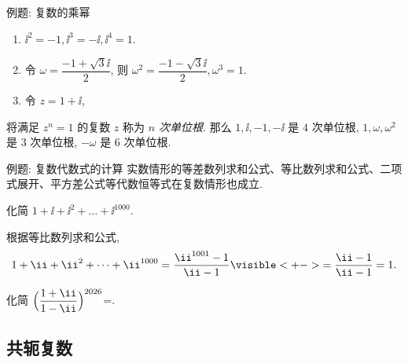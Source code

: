 \begin{frame}{例题: 复数的乘幂}
	\onslide<+->
	\begin{example}
		\begin{enumerate}
			\item $\ii^2=-1,\ii^3=-\ii ,\ii^4=1$.
			\onslide<+->{%
			一般地, 对于整数 $n$, 
			\[
				\ii^{4n}=1,\quad \ii^{4n+1}=\ii,\quad
				\ii^{4n+2}=-1,\quad \ii^{4n+3}=-\ii.
			\]
			}
			\bigdel
			\item 令 $\omega=\dfrac{-1+\sqrt 3\ii}2$, 则 $\omega^2=\dfrac{-1-\sqrt3\ii}2,\omega^3=1$.
			\item 令 $z=1+\ii$, \onslide<+->{则
			\[
				z^2=2\ii,\quad z^3=-2+2\ii,\quad z^4=-4,\quad z^8=16=2^4.
			\]}
		\end{enumerate}
		\bigdel\bigdel
	\end{example}
	\onslide<+->
	将满足 $z^n=1$ 的复数 $z$ 称为 \emph{$n$ 次单位根}.
	\onslide<+->
	那么 $1,\ii,-1,-\ii $ 是 $4$ 次单位根, $1,\omega,\omega^2$ 是 $3$ 次单位根, $-\omega$ 是 $6$ 次单位根.
\end{frame}


\begin{frame}{例题: 复数代数式的计算}
	\onslide<+->
	实数情形的等差数列求和公式、等比数列求和公式、二项式展开、平方差公式等代数恒等式在复数情形也成立.
	\onslide<+->
	\begin{example}[nearnext]
		化简 $1+\ii+\ii^2+\dots+\ii^{1000}$.
	\end{example}
	\onslide<+->
	\begin{solution}[nearprev]
		根据等比数列求和公式,
		\[
			1+\ii+\ii^2+\dots+\ii^{1000}
			=\dfrac{\ii^{1001}-1}{\ii-1}
			\visible<+->{=\dfrac{\ii-1}{\ii-1}=1.}
		\]
	\end{solution}
	\onslide<+->
	\begin{exercise}
		化简 $\Bigl(\dfrac{1+\ii}{1-\ii}\Bigr)^{2026}$=.
	\end{exercise}
\end{frame}


\subsection{共轭复数}


